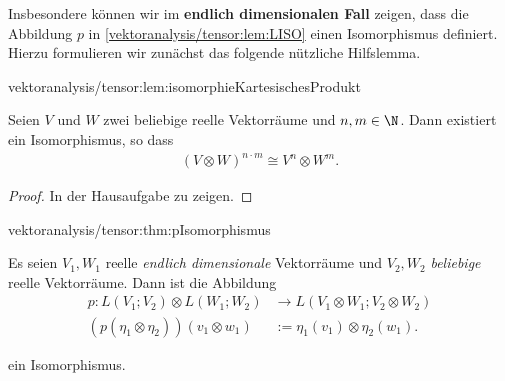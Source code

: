 \documentclass[letterpaper,10pt,english]{jupyterBook}
\begin{document}
\par
Insbesondere können wir im \textbf{endlich dimensionalen Fall} zeigen, dass die Abbildung \(p\) in \cref{vektoranalysis/tensor:lem:LISO} einen Isomorphismus definiert.
Hierzu formulieren wir zunächst das folgende nützliche Hilfslemma.
\begin{lemma}{}{vektoranalysis/tensor:lem:isomorphieKartesischesProdukt}



\par
Seien \(V\) und \(W\) zwei beliebige reelle Vektorräume und \(n,m \in \N\).
Dann existiert ein Isomorphismus, so dass
\begin{align*}
(V \otimes W)^{n\cdot m} \cong V^n \otimes W^m.
\end{align*}\end{lemma}

\begin{proof}
 In der Hausaufgabe zu zeigen.
\end{proof}
\begin{theorem}{}{vektoranalysis/tensor:thm:pIsomorphismus}



\par
Es seien \(V_1, W_1\) reelle \emph{endlich dimensionale} Vektorräume und \(V_2, W_2\) \emph{beliebige} reelle Vektorräume.
Dann ist die Abbildung
\begin{align*}
p:L(V_1; V_2)\otimes L(W_1; W_2) &\rightarrow L(V_1\otimes W_1; V_2\otimes W_2)\\
(p(\eta_1\otimes\eta_2))(v_1\otimes w_1)&:= \eta_1(v_1) \otimes \eta_2(w_1).
\end{align*}
\par
ein Isomorphismus.
\end{theorem}
\end{document}
